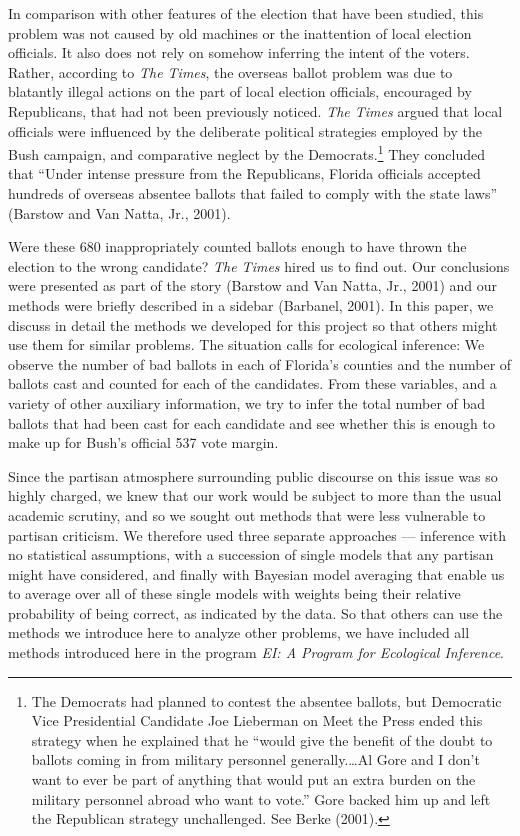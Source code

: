 \documentclass[11pt,titlepage]{article}
\begin{document}
In comparison with other features of the election that have been
studied, this problem was not caused by old machines or the
inattention of local election officials.  It also does not rely on
somehow inferring the intent of the voters.  Rather, according to
\emph{The Times}, the overseas ballot problem was due to blatantly
illegal actions on the part of local election officials, encouraged by
Republicans, that had not been previously noticed.  \emph{The Times}
argued that local officials were influenced by the deliberate
political strategies employed by the Bush campaign, and comparative
neglect by the Democrats.\footnote{The Democrats had planned to
  contest the absentee ballots, but Democratic Vice Presidential
  Candidate Joe Lieberman on Meet the Press ended this strategy when
  he explained that he ``would give the benefit of the doubt to
  ballots coming in from military personnel generally.\ldots Al Gore
  and I don't want to ever be part of anything that would put an extra
  burden on the military personnel abroad who want to vote.''  Gore
  backed him up and left the Republican strategy unchallenged.  See
  Berke (2001).}  They concluded that ``Under intense pressure from
the Republicans, Florida officials accepted hundreds of overseas
absentee ballots that failed to comply with the state laws'' (Barstow
and Van Natta, Jr., 2001)\nocite{BarVan01}.

Were these 680 inappropriately counted ballots enough to have thrown
the election to the wrong candidate?  \emph{The Times} hired us to
find out.  Our conclusions were presented as part of the story
(Barstow and Van Natta, Jr., 2001) and our methods were briefly
described in a sidebar (Barbanel, 2001)\nocite{Barbanel01}.  In this
paper, we discuss in detail the methods we developed for this project
so that others might use them for similar problems.  The situation
calls for ecological inference: We observe the number of bad ballots
in each of Florida's counties and the number of ballots cast and
counted for each of the candidates.  From these variables, and a
variety of other auxiliary information, we try to infer the total
number of bad ballots that had been cast for each candidate and see
whether this is enough to make up for Bush's official 537 vote margin.

Since the partisan atmosphere surrounding public discourse on this
issue was so highly charged, we knew that our work would be subject to
more than the usual academic scrutiny, and so we sought out methods
that were less vulnerable to partisan criticism. We therefore used
three separate approaches --- inference with no statistical
assumptions, with a succession of single models that any partisan
might have considered, and finally with Bayesian model averaging that
enable us to average over all of these single models with weights
being their relative probability of being correct, as indicated by the
data.  So that others can use the methods we introduce here to analyze
other problems, we have included all methods introduced here in the
program \emph{EI: A Program for Ecological Inference}.
\end{document}
